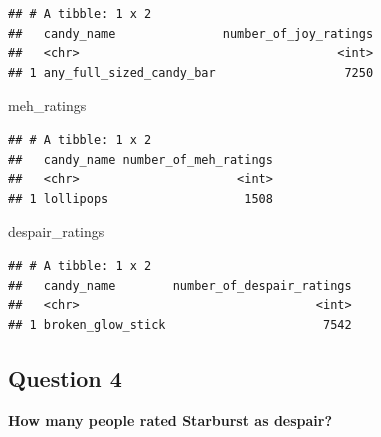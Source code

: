 \documentclass[]{article}
\newenvironment{Shaded}{\begin{snugshade}}{\end{snugshade}}
\newcommand{\DataTypeTok}[1]{\textcolor[rgb]{0.13,0.29,0.53}{#1}}
\newcommand{\KeywordTok}[1]{\textcolor[rgb]{0.13,0.29,0.53}{\textbf{#1}}}
\newcommand{\NormalTok}[1]{#1}
\newcommand{\OperatorTok}[1]{\textcolor[rgb]{0.81,0.36,0.00}{\textbf{#1}}}
\newcommand{\StringTok}[1]{\textcolor[rgb]{0.31,0.60,0.02}{#1}}
\begin{document}
\begin{verbatim}
## # A tibble: 1 x 2
##   candy_name               number_of_joy_ratings
##   <chr>                                    <int>
## 1 any_full_sized_candy_bar                  7250
\end{verbatim}

\begin{Shaded}
\begin{Highlighting}[]
\NormalTok{meh_ratings}
\end{Highlighting}
\end{Shaded}

\begin{verbatim}
## # A tibble: 1 x 2
##   candy_name number_of_meh_ratings
##   <chr>                      <int>
## 1 lollipops                   1508
\end{verbatim}

\begin{Shaded}
\begin{Highlighting}[]
\NormalTok{despair_ratings}
\end{Highlighting}
\end{Shaded}

\begin{verbatim}
## # A tibble: 1 x 2
##   candy_name        number_of_despair_ratings
##   <chr>                                 <int>
## 1 broken_glow_stick                      7542
\end{verbatim}

\hypertarget{question-4}{%
\subsection{Question 4}\label{question-4}}

\textbf{How many people rated Starburst as despair?}

\begin{Shaded}
\end{Shaded}
\end{document}
